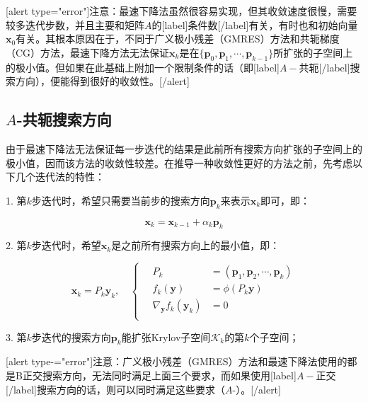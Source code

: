 \documentclass[UTF8,nofonts]{ctexart}
\begin{document}
[alert type="error"]注意：最速下降法虽然很容易实现，但其收敛速度很慢，需要较多迭代步数，并且主要和矩阵$A$的[label]条件数[/label]有关，有时也和初始向量$\boldsymbol{x}_0$有关。其根本原因在于，不同于广义极小残差（GMRES）方法和共轭梯度（CG）方法，最速下降方法无法保证$\boldsymbol{x}_{k}$是在$\{\boldsymbol{p}_0,\boldsymbol{p}_1,\cdots,\boldsymbol{p}_{k-1}\}$所扩张的子空间上的极小值。但如果在此基础上附加一个限制条件的话（即[label]$A-$共轭[/label]搜索方向），便能得到很好的收敛性。[/alert]



\subsection*{$A$-共轭搜索方向}

由于最速下降法无法保证每一步迭代的结果是此前所有搜索方向扩张的子空间上的极小值，因而该方法的收敛性较差。在推导一种收敛性更好的方法之前，先考虑以下几个迭代法的特性：

1. 第$k$步迭代时，希望只需要当前步的搜索方向$\boldsymbol{p}_k$来表示$\boldsymbol{x}_k$即可，即：

\begin{equation}
	\label{eq:xkpk}
	\boldsymbol{x}_k=\boldsymbol{x}_{k-1}+\alpha_k\boldsymbol{p}_k
\end{equation}

2. 第$k$步迭代时，希望$\boldsymbol{x}_k$是之前所有搜索方向上的最小值，即：

\begin{equation}
	\label{eq:minxk}
	\boldsymbol{x}_k=P_k\boldsymbol{y}_k,\quad
	\left\{\quad
		\begin{aligned}
			P_k &= (\boldsymbol{p}_1,\boldsymbol{p}_2,\cdots,\boldsymbol{p}_k) \\
			f_k(\boldsymbol{y}) &= \phi(P_k\boldsymbol{y}) \\
			\nabla_{\boldsymbol{y}}f_k(\boldsymbol{y}_k) &= 0 \\
		\end{aligned}
	\right.
\end{equation}

3. 第$k$步迭代的搜索方向$\boldsymbol{p}_k$能扩张Krylov子空间$\mathcal{K}_k$的第$k$个子空间；

[alert type-="error"]注意：广义极小残差（GMRES）方法和最速下降法使用的都是B正交搜索方向，无法同时满足上面三个要求，而如果使用[label]$A-$正交[/label]搜索方向的话，则可以同时满足这些要求（$A$-）。[/alert]
\end{document}
